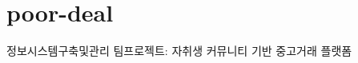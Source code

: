 \chapter{poor-\/deal }
\hypertarget{md__r_e_a_d_m_e}{}\label{md__r_e_a_d_m_e}
\label{md__r_e_a_d_m_e_autotoc_md0}%
%


정보시스템구축및관리 팀프로젝트\+: 자취생 커뮤니티 기반 중고거래 플랫폼 